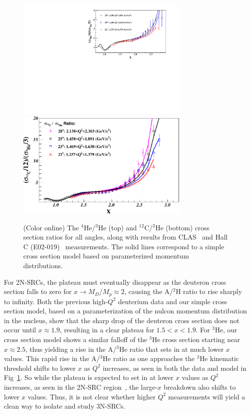                 \begin{figure}[!ht]
		\begin{center}
		  \includegraphics[width=8.5cm,angle=0]{He4_He3_XS_Ratio_MC}
                  \includegraphics[width=8.5cm,angle=0]{C12_He3_XS_Ratio_MC}
		\end{center}
		\vspace*{-5mm}
		\caption{(Color online) The $^4$He/$^3$He (top) and $^{12}$C/$^3$He (bottom) cross section ratios for all angles, 
		  along with results from CLAS~\cite{PhysRevLett.96.082501} and Hall C (E02-019)~\cite{fomin2012} measurements. The solid lines
                  correspond to a simple cross section model based on parameterized momentum distributions.}
		\label{fig:ratios_allqsq}
		\end{figure}

For 2N-SRCs, the plateau must eventually disappear as the deuteron cross section falls to zero for $ x \to
M_D / M_p\approx 2$, causing the A/$^2$H ratio to rise sharply to infinity. Both the previous high-$Q^2$
deuterium data and our simple cross section model, based on a parameterization of the nulcon momentum
distribution in the nucleus, show that the
sharp drop of the deuteron cross section does not occur until $x \approx 1.9$, resulting in a clear plateau
for $1.5 < x < 1.9$. For $^3$He, our cross section model shows a similar falloff of the $^3$He cross section
starting near $x \approx 2.5$, thus yielding a rise in the A/$^3$He ratio that sets in at much lower $x$
values. This rapid rise in the A/$^3$He ratio as one approaches the $^3$He kinematic threshold shifts to
lower $x$ as $Q^2$ increases, as seen in both the data and model in Fig~\ref{fig:ratios_allqsq}. So while
the plateau is expected to set in at lower $x$ values as $Q^2$ increases, as seen in the 2N-SRC
region~\cite{ SLAC_Measurement_PRC.48.2451, PhysRevLett.96.082501}, the large-$x$ breakdown also shifts to
lower $x$ values. Thus, it is not clear whether higher $Q^2$ measurements will yield a clean way to isolate
and study 3N-SRCs.

